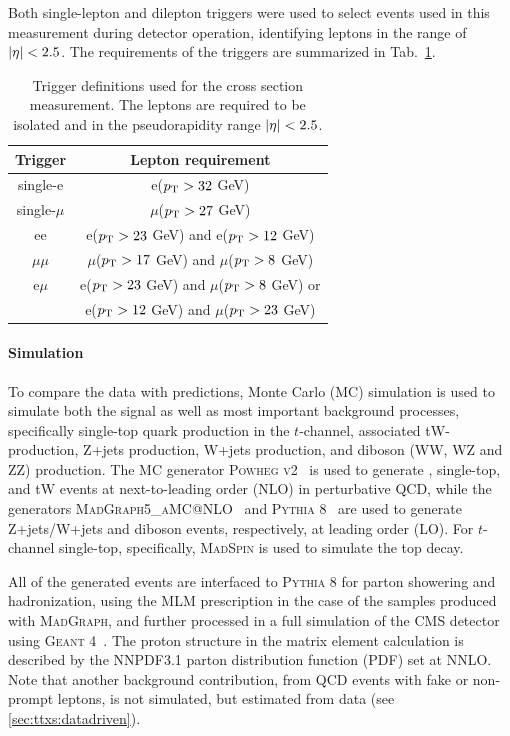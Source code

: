 
Both single-lepton and dilepton triggers were used to select events used in this measurement during detector operation, identifying leptons in the range of $|\eta| < 2.5$. The \pt requirements of the triggers are summarized in Tab.~\ref{tab:ttxs:triggers}.

\begin{table}
    \centering
    \begin{tabular}{c|c}
        Trigger & Lepton requirement \\
        \hline
        single-e & e($p_{\mathrm{T}} > 32$ GeV) \\
        single-$\mu$ & $\mu$($p_{\mathrm{T}} > 27$ GeV) \\
        ee & e($p_{\mathrm{T}} > 23$ GeV) and e($p_{\mathrm{T}} > 12$ GeV) \\
        $\mu\mu$ & $\mu$($p_{\mathrm{T}} > 17$ GeV) and $\mu$($p_{\mathrm{T}} > 8$ GeV) \\
        e$\mu$ & e($p_{\mathrm{T}} > 23$ GeV) and $\mu$($p_{\mathrm{T}} > 8$ GeV)  or \\
        & e($p_{\mathrm{T}} > 12$ GeV) and $\mu$($p_{\mathrm{T}} > 23$ GeV) \\
    \end{tabular}
    \caption{Trigger definitions used for the \ttbar cross section measurement. The leptons are required to be isolated and in the pseudorapidity range  $|\eta| < 2.5$.}
    \label{tab:ttxs:triggers}
\end{table}

\paragraph{Simulation}
To compare the data with predictions, Monte Carlo (MC) simulation is used to simulate both the \ttbar signal as well as most important background processes, specifically single-top quark production in the $t$-channel, associated tW-production, Z+jets production, W+jets production, and diboson (WW, WZ and ZZ) production. The MC generator \textsc{Powheg v2}~\cite{Powheg:2004, Powheg:2007, Powheg:2010} is used to generate \ttbar, single-top, and tW events at next-to-leading order (NLO) in perturbative QCD, while the generators \textsc{MadGraph5\_aMC@NLO}~\cite{MG5aMCatNLO:2014} and \textsc{Pythia 8}~\cite{Pythia:2015} are used to generate Z+jets/W+jets and diboson events, respectively, at leading order (LO). For $t$-channel single-top, specifically, \textsc{MadSpin} is used to simulate the top decay.

All of the generated events are interfaced to \textsc{Pythia 8} for parton showering and hadronization, using the MLM prescription in the case of the samples produced with \textsc{MadGraph}, and further processed in a full simulation of the CMS detector using \textsc{Geant 4}~\cite{GEANT4:2002}. The proton structure in the matrix element calculation is described by the NNPDF3.1 parton distribution function (PDF) set at NNLO. Note that another background contribution, from QCD events with fake or non-prompt leptons, is not simulated, but estimated from data (see \cref{sec:ttxs:datadriven}).

